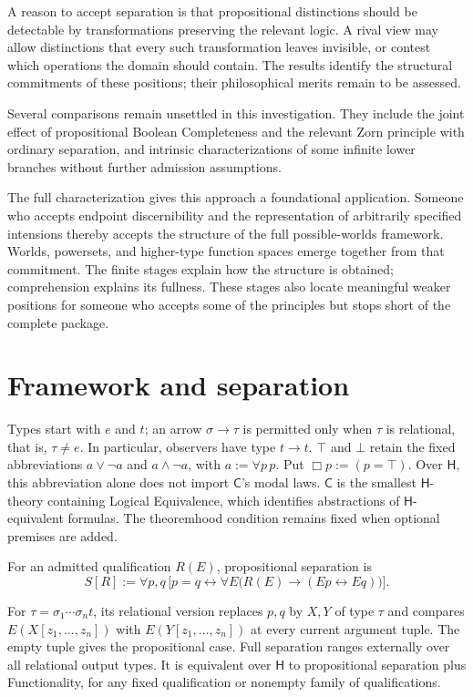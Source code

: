 \documentclass[12pt,letterpaper]{article}
\newcommand{\Hlogic}{\mathsf{H}}
\newcommand{\C}{\mathsf{C}}
\begin{document}
A reason to accept separation is that propositional distinctions should be detectable by transformations preserving the relevant logic. A rival view may allow distinctions that every such transformation leaves invisible, or contest which operations the domain should contain. The results identify the structural commitments of these positions; their philosophical merits remain to be assessed.


Several comparisons remain unsettled in this investigation. They include the joint effect of propositional Boolean Completeness and the relevant Zorn principle with ordinary separation, and intrinsic characterizations of some infinite lower branches without further admission assumptions.~\cite[\S10]{r15}


The full characterization gives this approach a foundational application. Someone who accepts endpoint discernibility and the representation of arbitrarily specified intensions thereby accepts the structure of the full possible-worlds framework. Worlds, powersets, and higher-type function spaces emerge together from that commitment. The finite stages explain how the structure is obtained; comprehension explains its fullness. These stages also locate meaningful weaker positions for someone who accepts some of the principles but stops short of the complete package.


\clearpage\styledappendices

\section{Framework and separation}

Types start with $e$ and $t$; an arrow $\sigma\to\tau$ is permitted only when $\tau$ is relational, that is, $\tau\ne e$. In particular, observers have type $t\to t$. $\top$ and $\bot$ retain the fixed abbreviations $a\lor\neg a$ and $a\land\neg a$, with $a:=\forall p\,p$. Put $\Box p:=(p=\top)$. Over $\Hlogic$, this abbreviation alone does not import $\C$'s modal laws. $\C$ is the smallest $\Hlogic$-theory containing Logical Equivalence, which identifies abstractions of $\Hlogic$-equivalent formulas. The theoremhood condition remains fixed when optional premises are added.~\cite{r1}


For an admitted qualification $R(E)$, propositional separation is
\[
S[R]:=\forall p,q\,\bigl[p=q\leftrightarrow\forall E\bigl(R(E)\to(Ep\leftrightarrow Eq)\bigr)\bigr].
\]

For $\tau=\sigma_1\cdots\sigma_n t$, its relational version replaces $p,q$ by $X,Y$ of type $\tau$ and compares $E(X[z_1,\ldots,z_n])$ with $E(Y[z_1,\ldots,z_n])$ at every current argument tuple. The empty tuple gives the propositional case. Full separation ranges externally over all relational output types. It is equivalent over $\Hlogic$ to propositional separation plus Functionality, for any fixed qualification or nonempty family of qualifications.~\cite[Theorem 1]{r6}
\end{document}
